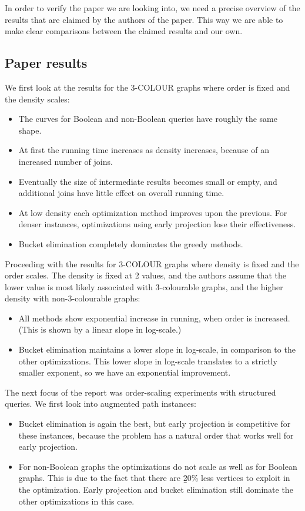 In order to verify the paper we are looking into, we need a precise overview of the results that are claimed by the authors of the paper. This way we are able to make clear comparisons between the claimed results and our own.

\subsection{Paper results}
We first look at the results for the 3-COLOUR graphs where order is fixed and the density scales:
\begin{itemize}
	\item The curves for Boolean and non-Boolean queries have roughly the same shape.
	\item At first the running time increases as density increases, because of an increased number of joins.
	\item Eventually the size of intermediate results becomes small or empty, and additional joins have little effect on overall running time.
	\item At low density each optimization method improves upon the previous. For denser instances, optimizations using early projection lose their effectiveness.
	\item Bucket elimination completely dominates the greedy methods.
\end{itemize}

\noindent Proceeding with the results for 3-COLOUR graphs where density is fixed and the order scales. The density is fixed at 2 values, and the authors assume that the lower value is most likely associated with 3-colourable graphs, and the higher density with non-3-colourable graphs:
\begin{itemize}
	\item All methods show exponential increase in running, when order is increased. (This is shown by a linear slope in log-scale.)
	\item Bucket elimination maintains a lower slope in log-scale, in comparison to the other optimizations. This lower slope in log-scale translates to a strictly smaller exponent, so we have an exponential improvement.
\end{itemize}

\noindent The next focus of the report was order-scaling experiments with structured queries. We first look into augmented path instances:
\begin{itemize}
	\item Bucket elimination is again the best, but early projection is competitive for these instances, because the problem has a natural order that works well for early projection.
	\item For non-Boolean graphs the optimizations do not scale as well as for Boolean graphs. This is due to the fact that there are {\b 20\% less vertices to exploit in the optimization}. Early projection and bucket elimination still dominate the other optimizations in this case.
\end{itemize}

